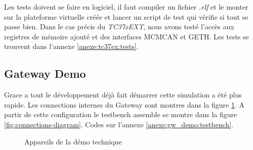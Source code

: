 Les tests doivent se faire en logiciel, il faut compiler un fichier \textit{.elf} et le monter sur la plateforme virtuelle créée et lancer un script de test qui vérifie si tout se passe bien. Dans le cas précis du \textit{TC37xEXT}, nous avons test\'e l'accès aux registres de mémoire ajout\'e et des interfaces MCMCAN et GETH. Les tests se trouvent dans l'annexe \ref{anexe:tc37ex:tests}. 


\subsection{Gateway Demo} 

Grace a tout le développement déjà fait démarrer cette simulation a été plus rapide. Les connections internes du Gateway sont montres dans la figure \ref{fig:devices-diagram}. A partir de cette configuration le testbench assemble se montre dans la figure \ref{fig:connections-diagram}. Codes sur l'annexe \ref{anexe:gw_demo:testbench}. 

\begin{figure}[!htb] 
    \centering 
    \caption{Appareils de la démo technique} 
    \label{fig:devices-diagram} 
\end{figure} 

